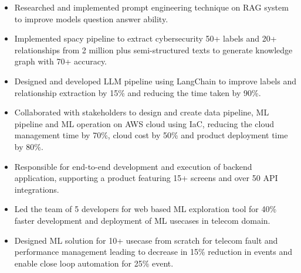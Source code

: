 \documentclass[10pt,a4paper,ragged2e,withhyper]{altacv}
\author{Madhusudan Kumar}
\date{\today}
\title{}
\begin{document}
\makecvheader
\begin{paracol}{2}
\label{sec:orge5919ff}


\begin{itemize}
\item Researched and implemented prompt engineering technique on RAG system to improve models question answer ability.
\end{itemize}

\par\divider
{}

\begin{itemize}
\item Implemented spacy pipeline to extract cybersecurity 50+ labels and 20+ relationships from 2 million plus semi-structured texts to generate knowledge graph with 70+ accuracy.
\item Designed and developed LLM pipeline using LangChain to improve labels and relationship extraction by 15\% and reducing the time taken by 90\%.
\item Collaborated with stakeholders to design and create data pipeline, ML pipeline and ML operation on AWS cloud using IaC, reducing the cloud management time by 70\%, cloud cost by 50\% and product deployment time by 80\%.
\item Responsible for end-to-end development and execution of backend application, supporting a product featuring 15+ screens and over 50 API integrations.
\end{itemize}


\par\divider
{}

\begin{itemize}
\item Led the team of 5 developers for web based ML exploration tool for 40\% faster development and deployment of ML usecases in telecom domain.
\item Designed ML solution for 10+ usecase from scratch for telecom fault and performance management leading to decrease in 15\% reduction in events and enable close loop automation for 25\% event.
\end{itemize}


\end{paracol}
\end{document}
